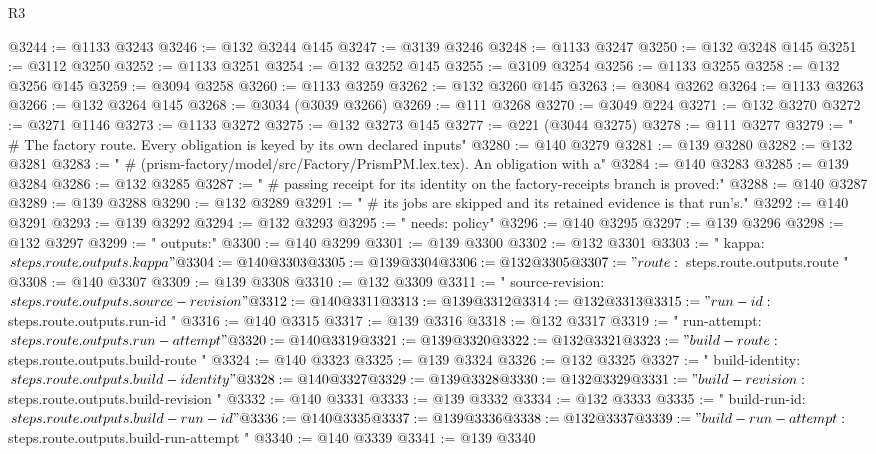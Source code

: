 \begin{lexlean}{R3}
\begin{coremodule}
@3244 := @1133 @3243
@3246 := @132 @3244 @145
@3247 := @3139 @3246
@3248 := @1133 @3247
@3250 := @132 @3248 @145
@3251 := @3112 @3250
@3252 := @1133 @3251
@3254 := @132 @3252 @145
@3255 := @3109 @3254
@3256 := @1133 @3255
@3258 := @132 @3256 @145
@3259 := @3094 @3258
@3260 := @1133 @3259
@3262 := @132 @3260 @145
@3263 := @3084 @3262
@3264 := @1133 @3263
@3266 := @132 @3264 @145
@3268 := @3034 (@3039 @3266)
@3269 := @111 @3268
@3270 := @3049 @224
@3271 := @132 @3270
@3272 := @3271 @1146
@3273 := @1133 @3272
@3275 := @132 @3273 @145
@3277 := @221 (@3044 @3275)
@3278 := @111 @3277
@3279 := "  # The factory route. Every obligation is keyed by its own declared inputs"
@3280 := @140 @3279
@3281 := @139 @3280
@3282 := @132 @3281
@3283 := "  # (prism-factory/model/src/Factory/PrismPM.lex.tex). An obligation with a"
@3284 := @140 @3283
@3285 := @139 @3284
@3286 := @132 @3285
@3287 := "  # passing receipt for its identity on the factory-receipts branch is proved:"
@3288 := @140 @3287
@3289 := @139 @3288
@3290 := @132 @3289
@3291 := "  # its jobs are skipped and its retained evidence is that run's."
@3292 := @140 @3291
@3293 := @139 @3292
@3294 := @132 @3293
@3295 := "    needs: policy"
@3296 := @140 @3295
@3297 := @139 @3296
@3298 := @132 @3297
@3299 := "    outputs:"
@3300 := @140 @3299
@3301 := @139 @3300
@3302 := @132 @3301
@3303 := "      kappa: ${{ steps.route.outputs.kappa }}"
@3304 := @140 @3303
@3305 := @139 @3304
@3306 := @132 @3305
@3307 := "      route: ${{ steps.route.outputs.route }}"
@3308 := @140 @3307
@3309 := @139 @3308
@3310 := @132 @3309
@3311 := "      source-revision: ${{ steps.route.outputs.source-revision }}"
@3312 := @140 @3311
@3313 := @139 @3312
@3314 := @132 @3313
@3315 := "      run-id: ${{ steps.route.outputs.run-id }}"
@3316 := @140 @3315
@3317 := @139 @3316
@3318 := @132 @3317
@3319 := "      run-attempt: ${{ steps.route.outputs.run-attempt }}"
@3320 := @140 @3319
@3321 := @139 @3320
@3322 := @132 @3321
@3323 := "      build-route: ${{ steps.route.outputs.build-route }}"
@3324 := @140 @3323
@3325 := @139 @3324
@3326 := @132 @3325
@3327 := "      build-identity: ${{ steps.route.outputs.build-identity }}"
@3328 := @140 @3327
@3329 := @139 @3328
@3330 := @132 @3329
@3331 := "      build-revision: ${{ steps.route.outputs.build-revision }}"
@3332 := @140 @3331
@3333 := @139 @3332
@3334 := @132 @3333
@3335 := "      build-run-id: ${{ steps.route.outputs.build-run-id }}"
@3336 := @140 @3335
@3337 := @139 @3336
@3338 := @132 @3337
@3339 := "      build-run-attempt: ${{ steps.route.outputs.build-run-attempt }}"
@3340 := @140 @3339
@3341 := @139 @3340

\end{coremodule}
\end{lexlean}
